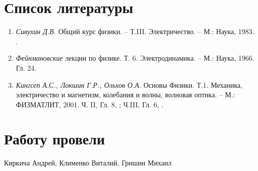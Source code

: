 \section*{Список литературы}
\begin{enumerate}
\item \textit{Сивухин Д.В.} Общий курс физики. -- Т.III. Электричество. -- М.: Наука, 1983. .
\item \textit{Фейнмановские} лекции по физике. Т. 6. Электродинамика. -- М.: Наука, 1966. Гл. 24.
\item \textit{Кингсеп А.С., Локшин Г.Р., Ольхов О.А.} Основы Физики. Т.1. Механика, электричество и магнетизм, колебания и волны, волновая оптика. -- М.: ФИЗМАТЛИТ, 2001. Ч. II, Гл. 8, ; Ч.III, Гл. 6, .
\end{enumerate}

\section*{Работу провели}
Киркича Андрей, Клименко Виталий, Гришин Михаил

